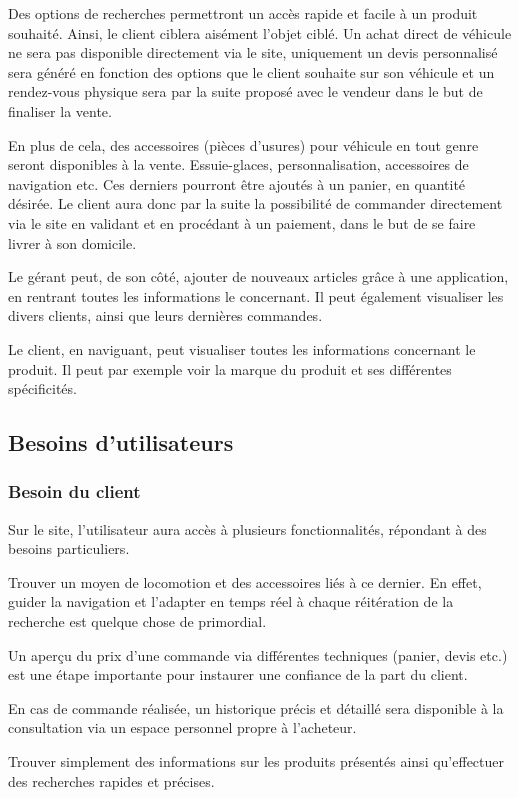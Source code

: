 \documentclass[a4paper]{article}
\begin{document}
	Des options de recherches permettront un accès rapide et facile à un produit souhaité. Ainsi, le client ciblera aisément l'objet ciblé.
Un achat direct de véhicule ne sera pas disponible directement via le site, uniquement un devis personnalisé sera généré en fonction des options que le client souhaite sur son véhicule et un rendez-vous physique sera par la suite proposé avec le vendeur dans le but de finaliser la vente.

	En plus de cela, des accessoires (pièces d'usures) pour véhicule en tout genre seront disponibles à la vente. Essuie-glaces, personnalisation, accessoires de navigation etc. Ces derniers pourront être ajoutés à un panier, en quantité désirée. Le client aura donc par la suite la possibilité de commander directement via le site en validant et en procédant à un paiement, dans le but de se faire livrer à son domicile.
	
	Le gérant peut, de son côté, ajouter de nouveaux articles grâce à une application, en rentrant toutes les informations le concernant. Il peut également visualiser les divers clients, ainsi que leurs dernières commandes. 

	Le client, en naviguant, peut visualiser toutes les informations concernant le produit. Il peut par exemple voir la marque du produit et ses différentes spécificités.
	\newpage
	\subsection{Besoins d'utilisateurs}
		\subsubsection{Besoin du client}
	Sur le site, l'utilisateur aura accès à plusieurs fonctionnalités, répondant à des besoins particuliers.
	
	Trouver un moyen de locomotion et des accessoires liés à ce dernier.
	En effet, guider la navigation et l'adapter en temps réel à chaque réitération de la recherche est quelque chose de primordial. 
	
	Un aperçu du prix d'une commande via différentes techniques (panier, devis etc.) est une étape importante pour instaurer une confiance de la part du client.
	
	En cas de commande réalisée, un historique précis et détaillé sera disponible à la consultation via un espace personnel propre à l'acheteur.
	
	Trouver simplement des informations sur les produits présentés ainsi qu'effectuer des recherches rapides et précises. 
	
\end{document}
